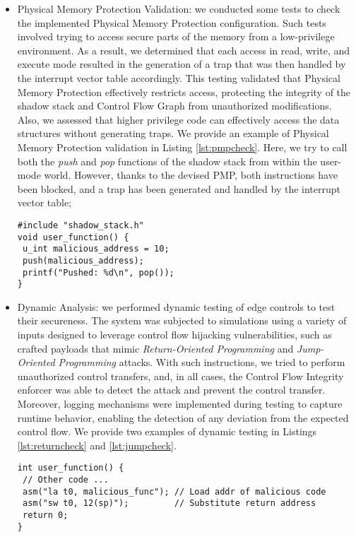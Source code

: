 \begin{itemize}
  \item Physical Memory Protection Validation: we conducted some tests to check
    the implemented Physical Memory Protection configuration. Such tests involved
    trying to access secure parts of the memory from a low-privilege environment.
    As a result, we determined that each access in read, write, and execute mode
    resulted in the generation of a trap that was then handled by the interrupt vector
    table accordingly. This testing validated that Physical Memory Protection
    effectively restricts access, protecting the integrity of the shadow stack and
    Control Flow Graph from unauthorized modifications. Also, we assessed that higher
    privilege code can effectively access the data structures without generating
    traps. We provide an example of Physical Memory Protection validation in
    Listing \ref{lst:pmpcheck}. Here, we try to call both the \textit{push} and \textit{pop}
    functions of the shadow stack from within the user-mode world. However,
    thanks to the devised PMP, both instructions have been blocked, and a trap
    has been generated and handled by the interrupt vector table;

    \begin{lstlisting}[style=CStyle, caption = Physical Memory Protection testing, label={lst:pmpcheck}]
#include "shadow_stack.h"
void user_function() {
 u_int malicious_address = 10;
 push(malicious_address);
 printf("Pushed: %d\n", pop());
}
 \end{lstlisting}

  \item Dynamic Analysis: we performed dynamic testing of edge controls to test
    their secureness. The system was subjected to simulations using a variety of
    inputs designed to leverage control flow hijacking vulnerabilities, such as
    crafted payloads that mimic \textit{Return-Oriented Programming} and \textit{Jump-Oriented
    Programming} attacks. With such instructions, we tried to perform
    unauthorized control transfers, and, in all cases, the Control Flow Integrity
    enforcer was able to detect the attack and prevent the control transfer.
    Moreover, logging mechanisms were implemented during testing to capture runtime
    behavior, enabling the detection of any deviation from the expected control
    flow. We provide two examples of dynamic testing in Listings \ref{lst:returncheck}
    and \ref{lst:jumpcheck}.

    \begin{lstlisting}[style=CStyle, caption = \textit{Return-Oriented Programming} simulation attack, label={lst:returncheck}]
int user_function() {
 // Other code ...
 asm("la t0, malicious_func"); // Load addr of malicious code
 asm("sw t0, 12(sp)");         // Substitute return address
 return 0;
}
 \end{lstlisting}


\end{itemize}
